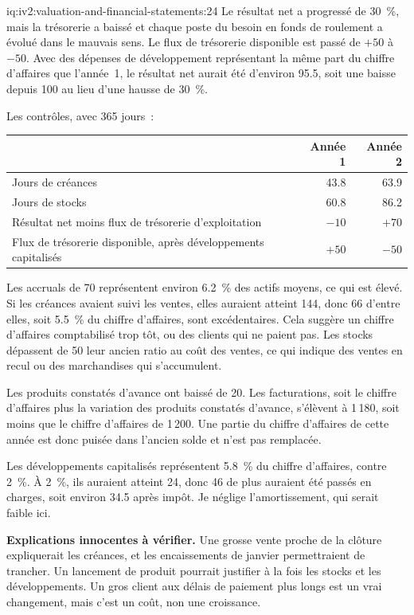 \begin{solution}{iq:iv2:valuation-and-financial-statements:24}
Le résultat net a progressé de 30~\%, mais la trésorerie a baissé et chaque poste du besoin en fonds de roulement a évolué dans le mauvais sens. Le flux de trésorerie disponible est passé de $+50$ à $-50$. Avec des dépenses de développement représentant la même part du chiffre d'affaires que l'année~1, le résultat net aurait été d'environ 95.5, soit une baisse depuis 100 au lieu d'une hausse de 30~\%.

Les contrôles, avec 365 jours~:
\begin{center}\small
\begin{tabular}{@{}lrr@{}}
 & Année 1 & Année 2 \\ \hline
Jours de créances & 43.8 & 63.9 \\
Jours de stocks & 60.8 & 86.2 \\
Résultat net moins flux de trésorerie d'exploitation & $-10$ & $+70$ \\
Flux de trésorerie disponible, après développements capitalisés & $+50$ & $-50$
\end{tabular}
\end{center}
Les accruals de 70 représentent environ 6.2~\% des actifs moyens, ce qui est élevé. Si les créances avaient suivi les ventes, elles auraient atteint 144, donc 66 d'entre elles, soit 5.5~\% du chiffre d'affaires, sont excédentaires. Cela suggère un chiffre d'affaires comptabilisé trop tôt, ou des clients qui ne paient pas. Les stocks dépassent de 50 leur ancien ratio au coût des ventes, ce qui indique des ventes en recul ou des marchandises qui s'accumulent.

Les produits constatés d'avance ont baissé de 20. Les facturations, soit le chiffre d'affaires plus la variation des produits constatés d'avance, s'élèvent à 1\,180, soit moins que le chiffre d'affaires de 1\,200. Une partie du chiffre d'affaires de cette année est donc puisée dans l'ancien solde et n'est pas remplacée.

Les développements capitalisés représentent 5.8~\% du chiffre d'affaires, contre 2~\%. À 2~\%, ils auraient atteint 24, donc 46 de plus auraient été passés en charges, soit environ 34.5 après impôt. Je néglige l'amortissement, qui serait faible ici.

\textbf{Explications innocentes à vérifier.} Une grosse vente proche de la clôture expliquerait les créances, et les encaissements de janvier permettraient de trancher. Un lancement de produit pourrait justifier à la fois les stocks et les développements. Un gros client aux délais de paiement plus longs est un vrai changement, mais c'est un coût, non une croissance.


\end{solution}
